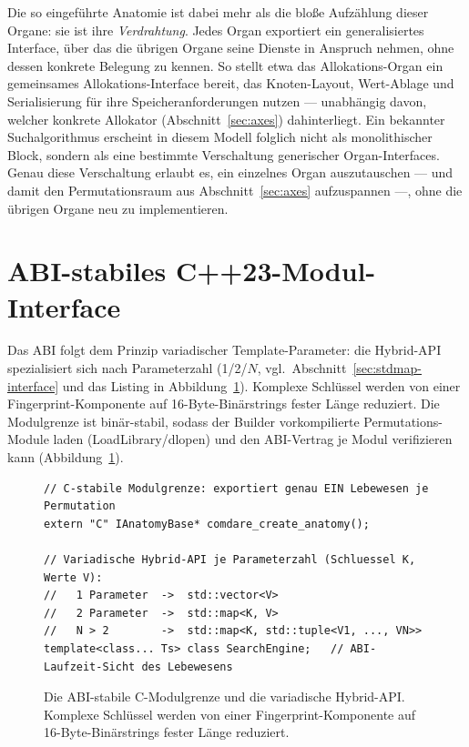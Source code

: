 Die so eingeführte Anatomie ist dabei mehr als die bloße Aufzählung dieser Organe: sie ist ihre
\emph{Verdrahtung}. Jedes Organ exportiert ein generalisiertes Interface, über das die übrigen
Organe seine Dienste in Anspruch nehmen, ohne dessen konkrete Belegung zu kennen. So stellt etwa
das Allokations-Organ ein gemeinsames Allokations-Interface bereit, das Knoten-Layout, Wert-Ablage
und Serialisierung für ihre Speicheranforderungen nutzen --- unabhängig davon, welcher konkrete
Allokator (Abschnitt~\ref{sec:axes}) dahinterliegt. Ein bekannter Suchalgorithmus erscheint in
diesem Modell folglich nicht als monolithischer Block, sondern als eine bestimmte Verschaltung
generischer Organ-Interfaces. Genau diese Verschaltung erlaubt es, ein einzelnes Organ
auszutauschen --- und damit den Permutationsraum aus Abschnitt~\ref{sec:axes} aufzuspannen ---,
ohne die übrigen Organe neu zu implementieren.

\section{ABI-stabiles C++23-Modul-Interface}\label{sec:abi}

Das ABI folgt dem Prinzip variadischer Template-Parameter: die Hybrid-API spezialisiert sich nach
Parameterzahl (1/2/$N$, vgl.\ Abschnitt~\ref{sec:stdmap-interface} und das Listing in
Abbildung~\ref{fig:abi}). Komplexe Schlüssel werden von einer
Fingerprint-Komponente auf 16-Byte-Binärstrings fester Länge reduziert. Die Modulgrenze ist
binär-stabil, sodass der Builder vorkompilierte Permutations-Module laden (LoadLibrary/dlopen) und
den ABI-Vertrag je Modul verifizieren kann (Abbildung~\ref{fig:abi}).

\begin{figure}[!htbp]
\begin{lstlisting}[basicstyle=\footnotesize\ttfamily,frame=single,xleftmargin=1.5em]
// C-stabile Modulgrenze: exportiert genau EIN Lebewesen je Permutation
extern "C" IAnatomyBase* comdare_create_anatomy();

// Variadische Hybrid-API je Parameterzahl (Schluessel K, Werte V):
//   1 Parameter  ->  std::vector<V>
//   2 Parameter  ->  std::map<K, V>
//   N > 2        ->  std::map<K, std::tuple<V1, ..., VN>>
template<class... Ts> class SearchEngine;   // ABI-Laufzeit-Sicht des Lebewesens
\end{lstlisting}
  \caption{Die ABI-stabile C-Modulgrenze und die variadische Hybrid-API\@. Komplexe Schlüssel werden
  von einer Fingerprint-Komponente auf 16-Byte-Binärstrings fester Länge reduziert.}\label{fig:abi}
\end{figure}


